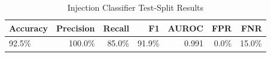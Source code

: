 \begin{table}[t]
\centering
\caption{Injection Classifier Test-Split Results}
\begin{tabular}{lrrrrrr}
\toprule
Accuracy & Precision & Recall & F1 & AUROC & FPR & FNR \\
\midrule
92.5\% & 100.0\% & 85.0\% & 91.9\% & 0.991 & 0.0\% & 15.0\% \\
\bottomrule
\end{tabular}
\end{table}
